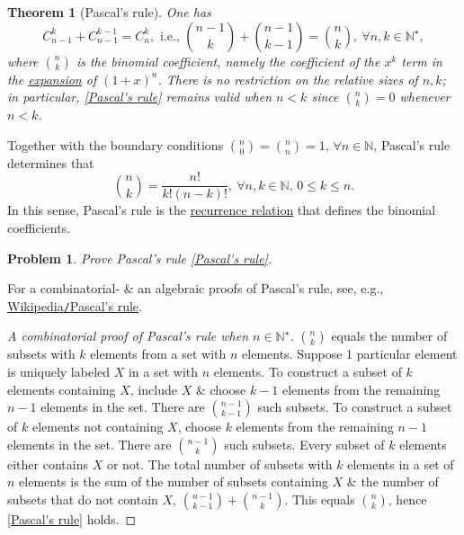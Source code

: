 \documentclass[oneside]{book}
\newtheorem{problem}{Problem}
\newtheorem{theorem}{Theorem}
\begin{document}
\begin{theorem}[Pascal's rule]
	One has
	\begin{equation}
		\label{Pascal's rule}
		\tag{Pasr}
		C_{n-1}^k + C_{n-1}^{k-1} = C_n^k,\mbox{ i.e., }\binom{n - 1}{k} + \binom{n - 1}{k - 1} = \binom{n}{k},\ \forall n,k\in\mathbb{N}^\star,
	\end{equation}
	where $\binom{n}{k}$ is the binomial coefficient, namely the coefficient of the $x^k$ term in the \href{https://en.wikipedia.org/wiki/Polynomial_expansion}{expansion} of $(1 + x)^n$. There is no restriction on the relative sizes of $n,k$; in particular, \eqref{Pascal's rule} remains valid when $n < k$ since $\binom{n}{k} = 0$ whenever $n < k$.
\end{theorem}
Together with the boundary conditions $\binom{n}{0} = \binom{n}{n} = 1$, $\forall n\in\mathbb{N}$, Pascal's rule determines that
\begin{equation*}
	\binom{n}{k} = \frac{n!}{k!(n - k)!},\ \forall n,k\in\mathbb{N},\,0\le k\le n.
\end{equation*}
In this sense, Pascal's rule is the \href{https://en.wikipedia.org/wiki/Recurrence_relation}{recurrence relation} that defines the binomial coefficients.

\begin{problem}
	Prove Pascal's rule \eqref{Pascal's rule}.
\end{problem}
For a combinatorial- \& an algebraic proofs of Pascal's rule, see, e.g., \href{https://en.wikipedia.org/wiki/Pascal%27s_rule}{Wikipedia{\tt/}Pascal's rule}.

\begin{proof}[A combinatorial proof of Pascal's rule when $n\in\mathbb{N}^\star$]
	$\binom{n}{k}$ equals the number of subsets with $k$ elements from a set with $n$ elements. Suppose 1 particular element is uniquely labeled $X$ in a set with $n$ elements. To construct a subset of $k$ elements containing $X$, include $X$ \& choose $k - 1$ elements from the remaining $n - 1$ elements in the set. There are $\binom{n - 1}{k - 1}$ such subsets. To construct a subset of $k$ elements not containing $X$, choose $k$ elements from the remaining $n - 1$ elements in the set. There are $\binom{n - 1}{k}$ such subsets. Every subset of $k$ elements either contains $X$ or not. The total number of subsets with $k$ elements in a set of $n$ elements is the sum of the number of subsets containing $X$ \& the number of subsets that do not contain $X$, $\binom{n - 1}{k - 1} + \binom{n - 1}{k}$. This equals $\binom{n}{k}$, hence \eqref{Pascal's rule} holds.
\end{proof}
\end{document}
